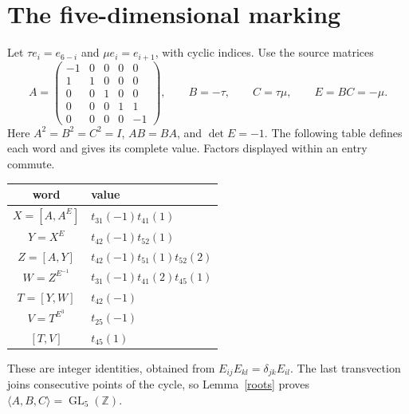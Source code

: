 \documentclass[11pt,a4paper]{article}
\newcommand{\GL}{\operatorname{GL}}\newcommand{\SL}{\operatorname{SL}}
\newcommand{\gen}[1]{\langle#1\rangle}\newcommand{\diag}{\operatorname{diag}}
\begin{document}
\section{The five-dimensional marking}
Let $\tau e_i=e_{6-i}$ and $\mu e_i=e_{i+1}$, with cyclic indices.
Use the source matrices
\[
 A=\begin{pmatrix}-1&0&0&0&0\\1&1&0&0&0\\0&0&1&0&0\\
 0&0&0&1&1\\0&0&0&0&-1\end{pmatrix},\qquad
 B=-\tau,\qquad C=\tau\mu,\qquad E=BC=-\mu.
                                                               \tag{3}
\]
Here $A^2=B^2=C^2=I$, $AB=BA$, and $\det E=-1$.
The following table defines each word and gives its complete value.
Factors displayed within an entry commute.
\begin{center}\small
\begin{tabular}{c|l}
word&value\\\hline
$X=[A,A^E]$&$t_{31}(-1)t_{41}(1)$\\
$Y=X^E$&$t_{42}(-1)t_{52}(1)$\\
$Z=[A,Y]$&$t_{42}(-1)t_{51}(1)t_{52}(2)$\\
$W=Z^{E^{-1}}$&$t_{31}(-1)t_{41}(2)t_{45}(1)$\\
$T=[Y,W]$&$t_{42}(-1)$\\
$V=T^{E^3}$&$t_{25}(-1)$\\
$[T,V]$&$t_{45}(1)$
\end{tabular}
\end{center}
These are integer identities, obtained from
$E_{ij}E_{kl}=\delta_{jk}E_{il}$. The last transvection joins
consecutive points of the cycle, so Lemma~\ref{roots} proves
$\gen{A,B,C}=\GL_5(\mathbb Z)$.
\end{document}
